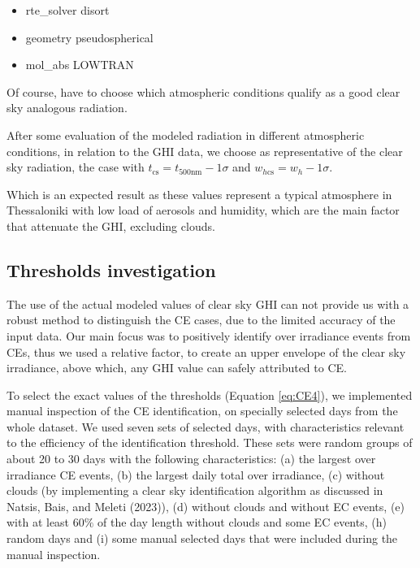 \documentclass[
]{article}
\providecommand{\tightlist}{%
  \setlength{\itemsep}{0pt}\setlength{\parskip}{0pt}}
\begin{document}
\begin{itemize}
\tightlist
\item
  rte\_solver disort
\item
  geometry pseudospherical
\item
  mol\_abs LOWTRAN
\end{itemize}

Of course, have to choose which atmospheric conditions qualify as a good clear sky analogous radiation.

After some evaluation of the modeled radiation in different atmospheric conditions,
in relation to the GHI data, we choose as representative of the clear sky radiation,
the case with
\(t_{\text{cs}} = t_{500\text{nm}} - 1\sigma\) and \(w_{h\text{cs}} = w_h - 1\sigma\).

Which is an expected result as these values represent a typical atmosphere in
Thessaloniki with low load of aerosols and humidity, which are the main factor that
attenuate the GHI, excluding clouds.

\hypertarget{thresholds-investigation}{%
\subsection{Thresholds investigation}\label{thresholds-investigation}}

The use of the actual modeled values of clear sky GHI can not provide us with a
robust method to distinguish the CE cases, due to the limited accuracy of the input
data. Our main focus was to positively identify over irradiance events from CEs,
thus we used a relative factor, to create an upper envelope of the clear sky
irradiance, above which, any GHI value can safely attributed to CE.

To select the exact values of the thresholds (Equation \ref{eq:CE4}), we implemented
manual inspection of the CE identification, on specially selected days from the whole
dataset. We used seven sets of selected days, with characteristics relevant to the
efficiency of the identification threshold. These sets were random groups of about
20 to 30 days with the following characteristics:
(a) the largest over irradiance CE events,
(b) the largest daily total over irradiance,
(c) without clouds (by implementing a clear sky identification algorithm as discussed in Natsis, Bais, and Meleti (2023)),
(d) without clouds and without EC events,
(e) with at least \(60\%\) of the day length without clouds and some EC events,
(h) random days and
(i) some manual selected days that were included during the manual inspection.
\end{document}
